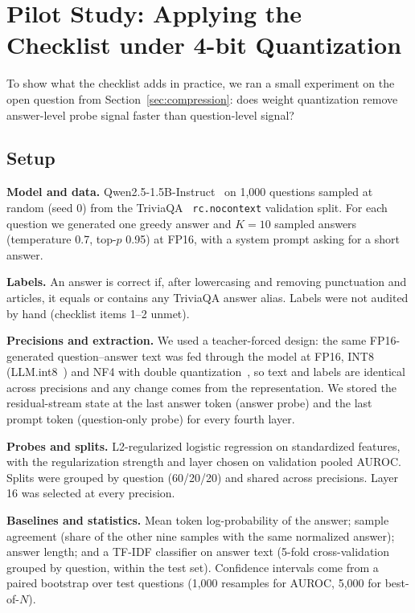 \documentclass[conference]{IEEEtran}
\begin{document}
\section{Pilot Study: Applying the Checklist under 4-bit Quantization}
\label{sec:pilot}

To show what the checklist adds in practice, we ran a small experiment on the open question from Section~\ref{sec:compression}: does weight quantization remove answer-level probe signal faster than question-level signal?

\subsection{Setup}
\textbf{Model and data.} Qwen2.5-1.5B-Instruct~\cite{qwen2025report} on 1,000 questions sampled at random (seed 0) from the TriviaQA~\cite{joshi2017triviaqa} \texttt{rc.nocontext} validation split. For each question we generated one greedy answer and $K{=}10$ sampled answers (temperature 0.7, top-$p$ 0.95) at FP16, with a system prompt asking for a short answer.

\textbf{Labels.} An answer is correct if, after lowercasing and removing punctuation and articles, it equals or contains any TriviaQA answer alias. Labels were not audited by hand (checklist items 1--2 unmet).

\textbf{Precisions and extraction.} We used a teacher-forced design: the same FP16-generated question--answer text was fed through the model at FP16, INT8 (LLM.int8~\cite{dettmers2022int8}) and NF4 with double quantization~\cite{dettmers2023qlora}, so text and labels are identical across precisions and any change comes from the representation. We stored the residual-stream state at the last answer token (answer probe) and the last prompt token (question-only probe) for every fourth layer.

\textbf{Probes and splits.} L2-regularized logistic regression on standardized features, with the regularization strength and layer chosen on validation pooled AUROC. Splits were grouped by question (60/20/20) and shared across precisions. Layer 16 was selected at every precision.

\textbf{Baselines and statistics.} Mean token log-probability of the answer; sample agreement (share of the other nine samples with the same normalized answer); answer length; and a TF-IDF classifier on answer text (5-fold cross-validation grouped by question, within the test set). Confidence intervals come from a paired bootstrap over test questions (1,000 resamples for AUROC, 5,000 for best-of-$N$).
\end{document}
